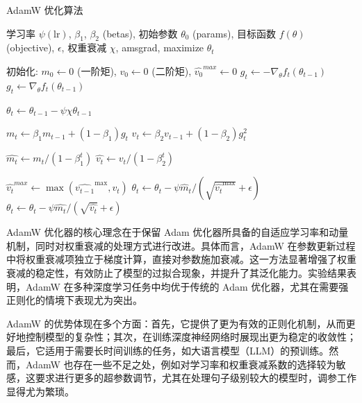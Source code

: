 \begin{algorithm}[htb]
\caption{AdamW 优化算法} \label{algo:AdamW}
\begin{algorithmic}[1]
    \Require 学习率 $\psi(\text{lr})$, $\beta_1$, $\beta_2$ (betas), 初始参数 $\theta_0$ (params), 目标函数 $f(\theta)$ (objective), $\epsilon$, 权重衰减 $\chi$, amsgrad, maximize
    \Ensure $\theta_t$
    
    \State 初始化: $m_0 \leftarrow 0$ (一阶矩), $v_0 \leftarrow 0$ (二阶矩), $\widehat{v_0}^{max} \leftarrow 0$
            \State $g_t \leftarrow - \nabla_\theta f_t(\theta_{t-1})$
        \Else
            \State $g_t \leftarrow \nabla_\theta f_t(\theta_{t-1})$
        \EndIf
        
        \State $\theta_t \leftarrow \theta_{t-1} - \psi \chi \theta_{t-1}$ 
        
        \State $m_t \leftarrow \beta_1 m_{t-1} + (1 - \beta_1) g_t$ 
        \State $v_t \leftarrow \beta_2 v_{t-1} + (1 - \beta_2) g_t^2$ 
        
        \State $\widehat{m_t} \leftarrow m_t / (1 - \beta_1^t)$ 
        \State $\widehat{v_t} \leftarrow v_t / (1 - \beta_2^t)$
        
            \State $\widehat{v_t}^{max} \leftarrow \max(\widehat{v_{t-1}}^{\text{max}}, \widehat{v_t})$
            \State $\theta_t \leftarrow \theta_t - \psi \widehat{m}_t / (\sqrt{\widehat{v_t}^{\text{max}}} + \epsilon)$
        \Else
            \State $\theta_t \leftarrow \theta_t - \psi \widehat{m_t} / (\sqrt{\widehat{v_t}} + \epsilon)$
        \EndIf
    \EndFor
\end{algorithmic}
\end{algorithm}

AdamW 优化器的核心理念在于保留 Adam 优化器所具备的自适应学习率和动量机制，同时对权重衰减的处理方式进行改进。具体而言，AdamW 在参数更新过程中将权重衰减项独立于梯度计算，直接对参数施加衰减。这一方法显著增强了权重衰减的稳定性，有效防止了模型的过拟合现象，并提升了其泛化能力。实验结果表明，AdamW 在多种深度学习任务中均优于传统的 Adam 优化器，尤其在需要强正则化的情境下表现尤为突出。

AdamW 的优势体现在多个方面：首先，它提供了更为有效的正则化机制，从而更好地控制模型的复杂性；其次，在训练深度神经网络时展现出更为稳定的收敛性；最后，它适用于需要长时间训练的任务，如大语言模型（LLM）的预训练。然而，AdamW 也存在一些不足之处，例如对学习率和权重衰减系数的选择较为敏感，这要求进行更多的超参数调节，尤其在处理句子级别较大的模型时，调参工作显得尤为繁琐。

